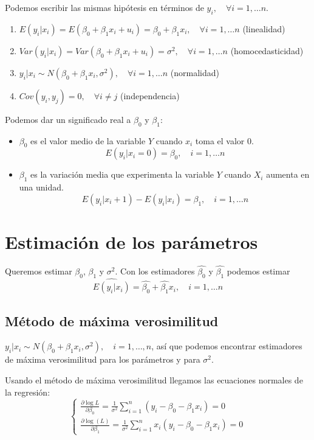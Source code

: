 \documentclass{report}
\theoremstyle{remark}
\theoremstyle{remark}
\theoremstyle{remark}
\theoremstyle{definition}
\theoremstyle{definition}
\theoremstyle{definition}
\begin{document}
Podemos escribir las mismas hipótesis en términos de $y_i, \quad \forall i = 1, \dots n$.
\begin{enumerate}
    \item $E(y_i | x_i) = E(\beta_0 + \beta_1x_i + u_i) = \beta_0 + \beta_1x_i, \quad \forall i = 1, \dots n$ (linealidad)
    \item $Var(y_i | x_i) = Var(\beta_0 + \beta_1x_i + u_i) = \sigma^2, \quad \forall i = 1, \dots n$ (homocedasticidad)
    \item $y_i | x_i \sim N(\beta_0 + \beta_1x_i, \sigma^2), \quad \forall i = 1, \dots n$ (normalidad)
    \item $Cov(y_i, y_j) = 0, \quad \forall i \neq j$ (independencia)
\end{enumerate}

Podemos dar un significado real a $\beta_0$ y $\beta_1$:
\begin{itemize}
    \item $\beta_0$ es el valor medio de la variable $Y$ cuando $x_i$ toma el valor 0.
          $$E(y_i | x_i = 0) = \beta_0, \quad i = 1, \dots n$$
    \item $\beta_1$ es la variación media que experimenta la variable $Y$ cuando $X_i$ aumenta en una unidad.
          $$E(y_i | x_i+1) - E(y_i | x_i) = \beta_1, \quad i = 1, \dots n$$
\end{itemize}

\section{Estimación de los parámetros}
Queremos estimar $\beta_0$, $\beta_1$ y $\sigma^2$.
Con los estimadores $\hat{\beta_0}$ y $\hat{\beta_1}$ podemos estimar $$\hat{E(y_i | x_i)} = \hat{\beta_0} + \hat{\beta_1}x_i, \quad i = 1, \dots n$$

\subsection*{Método de máxima verosimilitud}
$y_i | x_i \sim N(\beta_0 + \beta_1x_i, \sigma^2), \quad i = 1, \dots, n$, así que podemos encontrar estimadores de máxima verosimilitud para los parámetros y para $\sigma^2$.

Usando el método de máxima verosimilitud llegamos las ecuaciones normales de la regresión:
$$\begin{cases}
        \frac{\partial \log{L}}{\partial \beta_0} = \frac{1}{\sigma^2} \sum_{i=1}^n (y_i - \beta_0 - \beta_1x_i) = 0 \\
        \frac{\partial \log(L)}{\partial \beta_1} = \frac{1}{\sigma^2} \sum_{i=1}^n x_i(y_i - \beta_0 - \beta_1x_i) = 0
    \end{cases}$$
\end{document}
